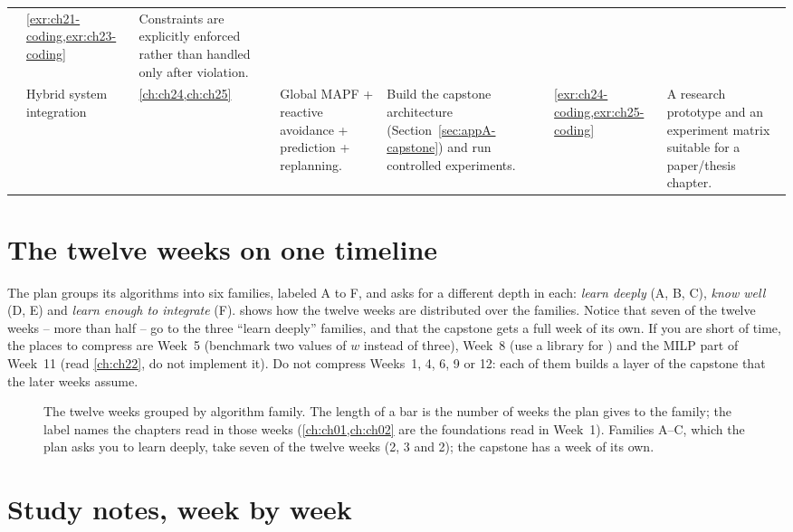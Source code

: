 {\begin{longtable}{@{}L{0.5cm}L{1.75cm}L{1.5cm}L{2.6cm}L{3.0cm}L{1.45cm}L{3.0cm}@{}}
  & \cref{exr:ch21-coding,exr:ch23-coding}
  & Constraints are explicitly enforced rather than handled only after violation.\\
 & Hybrid system integration
  & \cref{ch:ch24,ch:ch25}
  & Global MAPF + reactive avoidance + prediction + replanning.
  & Build the capstone architecture (Section~\ref{sec:appA-capstone}) and run controlled experiments.
  & \cref{exr:ch24-coding,exr:ch25-coding}
  & A research prototype and an experiment matrix suitable for a paper/thesis chapter.\\
\end{longtable}
}

\section{The twelve weeks on one timeline}
\label{sec:appA-timeline}

The plan groups its algorithms into six families, labeled A to F, and asks for a different
depth in each: \emph{learn deeply} (A, B, C), \emph{know well} (D, E) and \emph{learn enough
to integrate} (F).  shows how the twelve weeks are distributed over
the families. Notice that seven of the twelve weeks -- more than half -- go to the three
``learn deeply'' families, and that the capstone gets a full week of its own. If you are short of time, the
places to compress are Week~5 (benchmark two values of $w$ instead of three), Week~8 (use a
library for \rrtstar) and the MILP part of Week~11 (read \cref{ch:ch22}, do not implement it). Do not
compress Weeks~1, 4, 6, 9 or 12: each of them builds a layer of the capstone that the later
weeks assume.

\begin{figure}[htb]
\centering
{}
\caption{The twelve weeks grouped by algorithm family. The length of a bar is the number of
weeks the plan gives to the family; the label names the chapters read in those weeks
(\cref{ch:ch01,ch:ch02} are the foundations read in Week~1). Families A--C, which the plan
asks you to learn deeply, take seven of the twelve weeks (2, 3 and 2); the capstone has a week of its
own.}
\label{fig:appA-timeline}
\end{figure}

\section{Study notes, week by week}
\label{sec:appA-notes}

